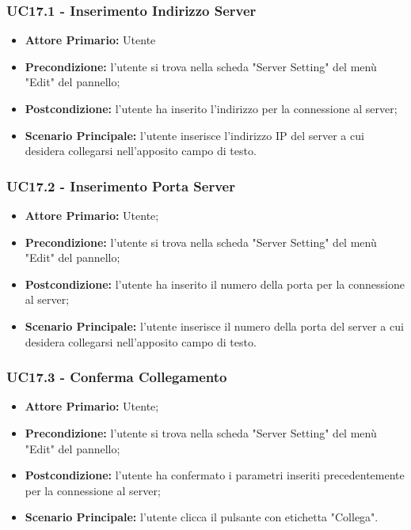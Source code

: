 \subsubsection{UC17.1 - Inserimento Indirizzo Server}\label{UC17.1}
\begin{itemize}
	\item \textbf{Attore Primario:}  Utente
	\item \textbf{Precondizione:} l'utente si trova nella scheda "Server Setting" del menù "Edit" del pannello;
	\item \textbf{Postcondizione:} l'utente ha inserito l'indirizzo per la connessione al server;
	\item \textbf{Scenario Principale:} l'utente inserisce l'indirizzo IP del server a cui desidera collegarsi nell'apposito campo di testo.
\end{itemize}

\subsubsection{UC17.2 - Inserimento Porta Server}\label{UC17.2}
\begin{itemize}
	\item \textbf{Attore Primario:}  Utente;
	\item \textbf{Precondizione:} l'utente si trova nella scheda "Server Setting" del menù "Edit" del pannello;
	\item \textbf{Postcondizione:} l'utente ha inserito il numero della porta per la connessione al server;
	\item \textbf{Scenario Principale:} l'utente inserisce il numero della porta del server a cui desidera collegarsi nell'apposito campo di testo.
\end{itemize}

\subsubsection{UC17.3 - Conferma Collegamento}\label{UC17.3}
\begin{itemize}
	\item \textbf{Attore Primario:}  Utente;
	\item \textbf{Precondizione:} l'utente si trova nella scheda "Server Setting" del menù "Edit" del pannello;
	\item \textbf{Postcondizione:} l'utente ha confermato i parametri inseriti precedentemente per la connessione al server;
	\item \textbf{Scenario Principale:} l'utente clicca il pulsante con etichetta "Collega".
\end{itemize}

